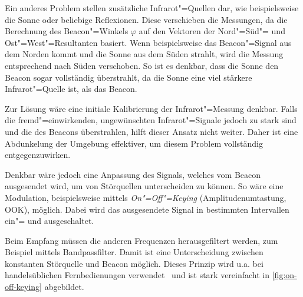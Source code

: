 
Ein anderes Problem stellen zusätzliche Infrarot"=Quellen dar, wie beispielsweise die Sonne oder beliebige Reflexionen. Diese verschieben die Messungen, da die Berechnung des Beacon"=Winkels $\varphi$ auf den Vektoren der Nord"=Süd"= und Ost"=West"=Resultanten basiert. Wenn beispielsweise das Beacon"=Signal aus dem Norden kommt und die Sonne aus dem Süden strahlt, wird die Messung entsprechend nach Süden verschoben. So ist es denkbar, dass die Sonne den Beacon sogar vollständig überstrahlt, da die Sonne eine viel stärkere Infrarot"=Quelle ist, als das Beacon.

Zur Lösung wäre eine initiale Kalibrierung der Infrarot"=Messung denkbar. Falls die fremd"=einwirkenden, ungewünschten Infrarot"=Signale jedoch zu stark sind und die des Beacons überstrahlen, hilft dieser Ansatz nicht weiter. Daher ist eine Abdunkelung der Umgebung effektiver, um diesem Problem vollständig entgegenzuwirken.

Denkbar wäre jedoch eine Anpassung des Signals, welches vom Beacon ausgesendet wird, um von Störquellen unterscheiden zu können. So wäre eine Modulation, beispielsweise mittels \emph{On"=Off"=Keying} (Amplitudenumtastung, OOK), möglich. Dabei wird das ausgesendete Signal in bestimmten Intervallen ein"= und ausgeschaltet. 

Beim Empfang müssen die anderen Frequenzen herausgefiltert werden, zum Beispiel mittels Bandpassfilter. Damit ist eine Unterscheidung zwischen konstanten Störquelle und Beacon möglich. Dieses Prinzip wird u.a. bei handelsüblichen Fernbedienungen verwendet~\cite{ewaldIRFernbedienungen2019} und ist stark vereinfacht in \autoref{fig:on-off-keying} abgebildet.

